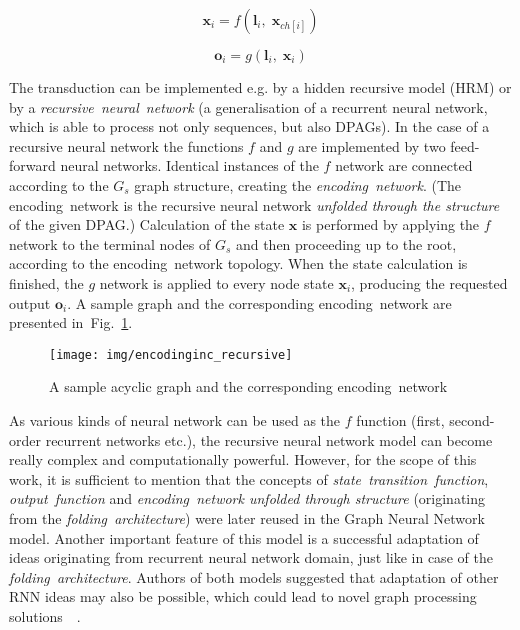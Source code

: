 \begin{equation}
\bm{x}_i = f(\bm{l}_i, \; \bm{x}_{ch[i]})
\label{eq:recursive_state}
\end{equation}

\begin{equation}
	\bm{o}_i = g(\bm{l}_i, \; \bm{x}_i)
\label{eq:recursive_output}
\end{equation}

The transduction can be implemented e.g. by a hidden recursive model (HRM) or by a \emph{recursive~neural~network} (a generalisation of a recurrent neural network, which is able to process not only sequences, but also DPAGs). In the case of a recursive neural network the functions $f$ and $g$ are implemented by two feed-forward neural networks. Identical instances of the $f$ network are connected according to the $G_s$ graph structure, creating the \emph{encoding~network}. (The encoding~network is the recursive neural network \emph{unfolded through the structure} of the given DPAG.) Calculation of the state $\bm{x}$ is performed by applying the $f$ network to the terminal nodes of $G_s$ and then proceeding up to the root, according to the encoding~network topology. When the state calculation is finished, the $g$ network is applied to every node state $\bm{x}_i$, producing the requested output $\bm{o}_i$. A sample graph and the corresponding encoding~network are presented in~Fig.~\ref{fig:recursive}.

\begin{figure}
\begin{center}
	\texttt{[image: img/encodinginc\_recursive]}
	\caption{A sample acyclic graph and the corresponding encoding~network}
	\label{fig:recursive}
\end{center}
\end{figure}

As various kinds of neural network can be used as the $f$ function (first, second-order recurrent networks etc.), the recursive neural network model can become really complex and computationally powerful. However, for the scope of this work, it is sufficient to mention that the concepts of \emph{state~transition~function}, \emph{output~function} and \emph{encoding~network unfolded through structure} (originating from the \emph{folding~architecture}) were later reused in the Graph Neural Network model. Another important feature of this model is a successful adaptation of ideas originating from recurrent neural network domain, just like in case of the \emph{folding~architecture}. Authors of both models suggested that adaptation of other RNN ideas may also be possible, which could lead to novel graph processing solutions~\cite{kuchler1996inductive}~\cite{frasconi1998general}.

